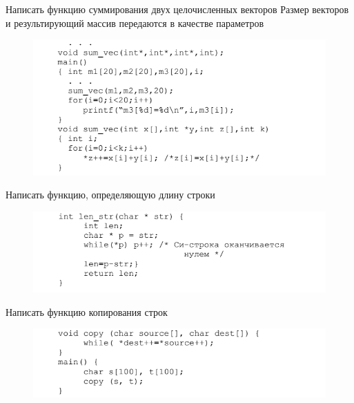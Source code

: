 \documentclass{beamer}
\begin{document}
\begin{frame}{Написать функцию суммирования двух целочисленных векторов}
Размер векторов и результирующий массив передаются в качестве параметров
\begin{figure}[h]
\centering
\includegraphics[scale=0.7]{images/lec03-pic26.png}
\end{figure}
\end{frame}

\begin{frame}{Написать функцию, определяющую длину строки}
\begin{figure}[h]
\centering
\includegraphics[scale=0.75]{images/lec03-pic27.png}
\end{figure}
\end{frame}

\begin{frame}{Написать функцию копирования строк}
\begin{figure}[h]
\centering
\includegraphics[scale=0.75]{images/lec03-pic28.png}
\end{figure}
\end{frame}
\end{document}
